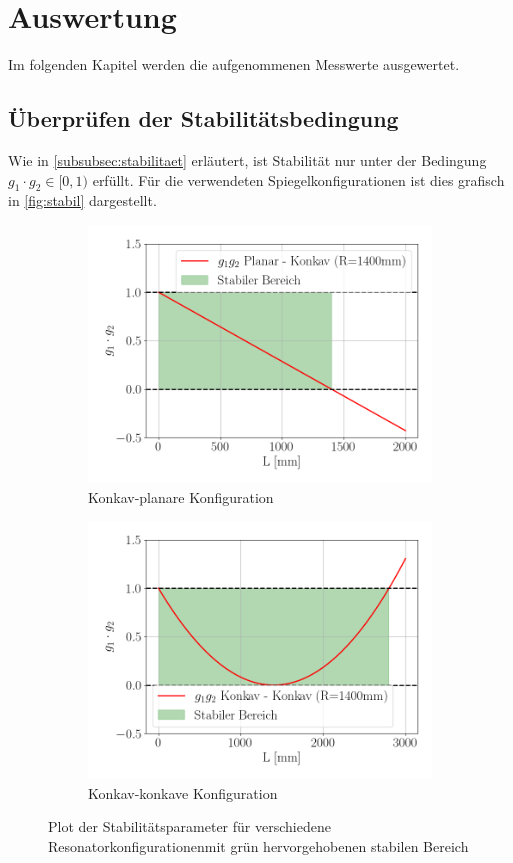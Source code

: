 \section{Auswertung}\label{sec:auswertung}
Im folgenden Kapitel werden die aufgenommenen Messwerte ausgewertet.
\subsection{Überprüfen der Stabilitätsbedingung}
Wie in \autoref{subsubsec:stabilitaet} erläutert, ist Stabilität nur unter der Bedingung $g_1\cdot g_2\in[0,1)$ erfüllt. Für die verwendeten Spiegelkonfigurationen ist dies grafisch in \autoref{fig:stabil} dargestellt.
\begin{figure}[H]
    \centering
    \begin{subfigure}[b]{0.48\textwidth}
        \centering
        \includegraphics[scale=0.4]{Skripte/2000.png}
        \caption{Konkav-planare Konfiguration}
    \end{subfigure}
    \hfill
    \begin{subfigure}[b]{0.48\textwidth}
        \centering
        \includegraphics[scale=0.4]{Skripte/3000.png}
        \caption{Konkav-konkave Konfiguration}
    \end{subfigure}
    \caption{Plot der Stabilitätsparameter für verschiedene Resonatorkonfigurationenmit grün hervorgehobenen stabilen Bereich}
    \label{fig:stabil}
\end{figure}
